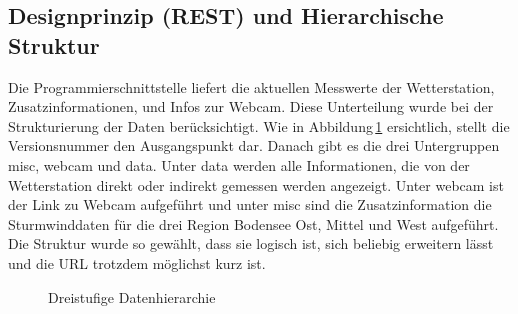 \subsection{Designprinzip (REST) und Hierarchische Struktur}
Die Programmierschnittstelle liefert die aktuellen Messwerte der Wetterstation, Zusatzinformationen, und Infos zur Webcam. Diese Unterteilung wurde bei der Strukturierung der Daten berücksichtigt.
Wie in Abbildung\,\ref{img:hierarchie} ersichtlich, stellt die Versionsnummer den Ausgangspunkt dar. Danach gibt es die drei Untergruppen misc, webcam und data. Unter data werden alle Informationen, die von der Wetterstation direkt oder indirekt gemessen werden angezeigt. Unter webcam ist der Link zu Webcam aufgeführt und unter misc sind die Zusatzinformation die Sturmwinddaten für die drei Region Bodensee Ost, Mittel und West aufgeführt. Die Struktur wurde so gewählt, dass sie logisch ist, sich beliebig erweitern lässt und die URL trotzdem möglichst kurz ist.

\begin{figure}[htbp!]
	\centering
	\caption{Dreistufige Datenhierarchie}
	\label{img:hierarchie}
\end{figure}







